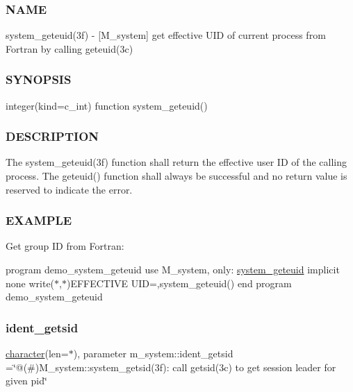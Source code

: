 \subsubsection*{N\+A\+ME}

system\+\_\+geteuid(3f) -\/ \mbox{[}M\+\_\+system\mbox{]} get effective U\+ID of current process from Fortran by calling geteuid(3c) \subsubsection*{S\+Y\+N\+O\+P\+S\+IS}

integer(kind=c\+\_\+int) function system\+\_\+geteuid()

\subsubsection*{D\+E\+S\+C\+R\+I\+P\+T\+I\+ON}

The system\+\_\+geteuid(3f) function shall return the effective user ID of the calling process. The geteuid() function shall always be successful and no return value is reserved to indicate the error. \subsubsection*{E\+X\+A\+M\+P\+LE}

Get group ID from Fortran\+:

program demo\+\_\+system\+\_\+geteuid use M\+\_\+system, only\+: \hyperlink{interfacem__system_1_1system__geteuid}{system\+\_\+geteuid} implicit none write($\ast$,$\ast$)\textquotesingle{}E\+F\+F\+E\+C\+T\+I\+VE U\+ID=\textquotesingle{},system\+\_\+geteuid() end program demo\+\_\+system\+\_\+geteuid \mbox{\label{namespacem__system_a16a71dfbcb5290eef064fa7f628018bb}} 
\subsubsection{\texorpdfstring{ident\+\_\+getsid}{ident\_getsid}}
{\footnotesize\ttfamily \hyperlink{option__stopwatch_83_8txt_abd4b21fbbd175834027b5224bfe97e66}{character}(len=$\ast$), parameter m\+\_\+system\+::ident\+\_\+getsid =\char`\"{}@(\#)M\+\_\+system\+::system\+\_\+getsid(3f)\+: call getsid(3c) to get session leader for given pid\char`\"{}\hspace{0.3cm}{\ttfamily [private]}}



